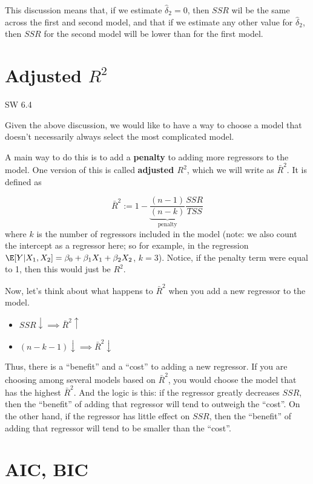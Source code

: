 \documentclass[
  letterpaper,
  DIV=11,
  numbers=noendperiod]{scrreprt}
\begin{document}
This discussion means that, if we estimate \(\hat{\delta}_2=0\), then
\(SSR\) wil be the same across the first and second model, and that if
we estimate any other value for \(\hat{\delta}_2\), then \(SSR\) for the
second model will be lower than for the first model.

\section{\texorpdfstring{Adjusted
\(R^2\)}{Adjusted R\^{}2}}\label{adjusted-r2}

SW 6.4

Given the above discussion, we would like to have a way to choose a
model that doesn't necessarily always select the most complicated model.

A main way to do this is to add a \textbf{penalty} to adding more
regressors to the model. One version of this is called \textbf{adjusted
\(R^2\)}, which we will write as \(\bar{R}^2\). It is defined as

\[
  \bar{R}^2 := 1 - \underbrace{\frac{(n-1)}{(n-k)}}_{\textrm{penalty}} \frac{SSR}{TSS}
\] where \(k\) is the number of regressors included in the model (note:
we also count the intercept as a regressor here; so for example, in the
regression \(\E[Y|X_1,X_2] = \beta_0 + \beta_1 X_1 + \beta_2 X_2\),
\(k=3\)). Notice, if the penalty term were equal to 1, then this would
just be \(R^2\).

Now, let's think about what happens to \(\bar{R}^2\) when you add a new
regressor to the model.

\begin{itemize}
\item
  \(SSR \downarrow \implies \bar{R}^2 \uparrow\)
\item
  \((n-k-1) \downarrow \implies \bar{R}^2 \downarrow\)
\end{itemize}

Thus, there is a ``benefit'' and a ``cost'' to adding a new regressor.
If you are choosing among several models based on \(\bar{R}^2\), you
would choose the model that has the highest \(\bar{R}^2\). And the logic
is this: if the regressor greatly decreases \(SSR\), then the
``benefit'' of adding that regressor will tend to outweigh the ``cost''.
On the other hand, if the regressor has little effect on \(SSR\), then
the ``benefit'' of adding that regressor will tend to be smaller than
the ``cost''.

\section{AIC, BIC}\label{aic-bic}
\end{document}
